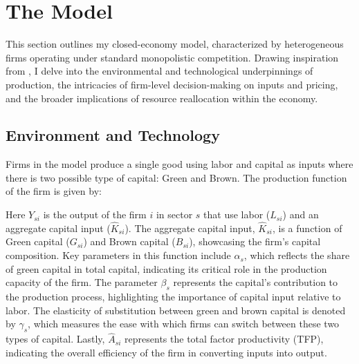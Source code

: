 
\section{The Model} \label{sec:Model}

This section outlines my closed-economy model, characterized by heterogeneous firms operating under standard monopolistic competition. Drawing inspiration from \cite{hsieh2009misallocation}, I delve into the environmental and technological underpinnings of production, the intricacies of firm-level decision-making on inputs and pricing, and the broader implications of resource reallocation within the economy.

\subsection{Environment and Technology} \label{sec:env_tech}

Firms in the model produce a single good using labor and capital as inputs where there is two possible type of capital: Green and Brown. The production function of the firm is given by:

Here $Y_{si}$ is the output of the firm $i$ in sector $s$ that use  labor ($L_{si}$) and an aggregate capital input ($\hat{K}_{si}$). The aggregate capital input, $\hat{K}_{si}$, is a function of Green capital ($G_{si}$) and Brown capital ($B_{si}$), showcasing the firm's capital composition. Key parameters in this function include $\alpha_s$, which reflects the share of green capital in total capital, indicating its critical role in the production capacity of the firm. The parameter $\beta_s$ represents the capital's contribution to the production process, highlighting the importance of capital input relative to labor. The elasticity of substitution between green and brown capital is denoted by $\gamma_s$, which measures the ease with which firms can switch between these two types of capital. Lastly, $\hat{A}_{si}$ represents the total factor productivity (TFP), indicating the overall efficiency of the firm in converting inputs into output.

